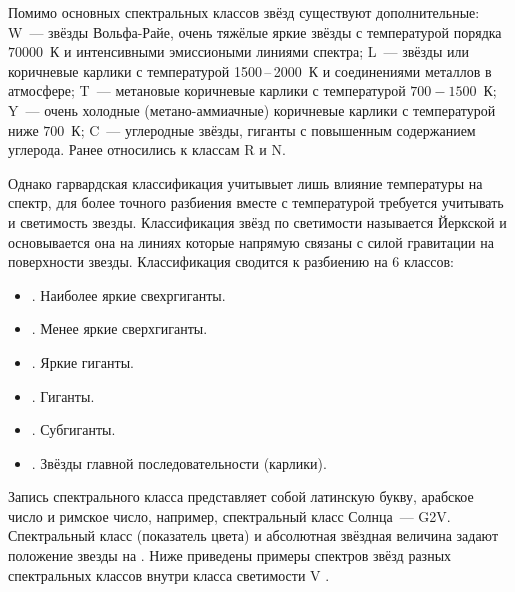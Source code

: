Помимо основных спектральных классов звёзд существуют дополнительные: W~--- звёзды Вольфа-Райе, очень тяжёлые яркие звёзды с температурой порядка $70000$~К и интенсивными эмиссиоными линиями спектра; L~--- звёзды или коричневые карлики с температурой 1500\,--\,2000~К и соединениями металлов в атмосфере; T~--- метановые коричневые карлики с температурой $700 - 1500$~К; Y~---  очень холодные (метано-аммиачные) коричневые карлики с температурой ниже $700$~К; C~--- углеродные звёзды, гиганты с повышенным содержанием углерода. Ранее относились к классам R и N.

Однако гарвардская классификация учитывыет лишь влияние температуры на спектр, для более точного разбиения вместе с температурой требуется учитывать и светимость звезды. Классификация звёзд по светимости называется Йеркской и основывается она на линиях которые напрямую связаны с силой гравитации на поверхности звезды. Классификация сводится к разбиению на 6 классов:
\begin{itemize}
	\item {}. Наиболее яркие свехргиганты.
	\item {}. Менее яркие сверхгиганты.
	\item {}. Яркие гиганты.
	\item {}. Гиганты.
	\item {}. Субгиганты.
	\item {}. Звёзды главной последовательности (карлики).
\end{itemize}
Запись спектрального класса представляет собой латинскую букву, арабское число и римское число, например, спектральный класс Солнца~--- G2V. Спектральный класс (показатель цвета) и абсолютная звёздная величина задают положение звезды на . Ниже приведены примеры спектров звёзд разных спектральных классов внутри класса светимости V .
